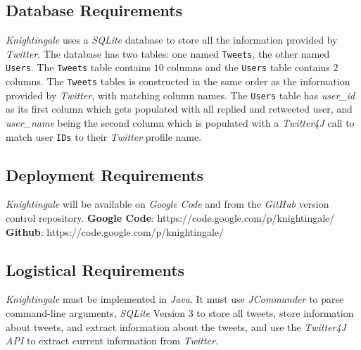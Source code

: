 \documentclass[a4paper, 12pt]{article}
\begin{document}
\subsection{Database Requirements} \label{sec:database}
\begin{adjustwidth}{2em}{0pt}
\textit{Knightingale} uses a \textit{SQLite} database to store all the information provided by \textit{Twitter}. The database has two tables: one named \texttt{Tweets}, the other named \texttt{Users}. The \texttt{Tweets} table contains $10$ columns and the \texttt{Users} table contains $2$ columns. The \texttt{Tweets} tables is constructed in the same order as the information provided by \textit{Twitter}, with matching column names. The \texttt{Users} table has \textit{user\_id} as its first column which gets populated with all replied and retweeted user, and \textit{user\_name} being the second column which is populated with a \textit{Twitter4J} call to match user \texttt{IDs} to their \textit{Twitter} profile name.
\end{adjustwidth}

\subsection{Deployment Requirements} \label{sec:deployment}
\begin{adjustwidth}{2em}{0pt}
\textit{Knightingale} will be available on \textit{Google Code} and from the \textit{GitHub} version control repository. \newline
\noindent \textbf{Google Code}: https://code.google.com/p/knightingale/ \newline
\noindent \textbf{Github}: https://code.google.com/p/knightingale/
\end{adjustwidth}

\subsection{Logistical Requirements} \label{sec:logistic}
\begin{adjustwidth}{2em}{0pt}
\textit{Knightingale} must be implemented in \textit{Java}. It must use \textit{JCommander} to parse command-line arguments, \textit{SQLite} Version $3$ to store all tweets, store information about tweets, and extract information about the tweets, and use the \textit{Twitter4J API} to extract current information from \textit{Twitter}.
\end{adjustwidth} 
\end{document}
